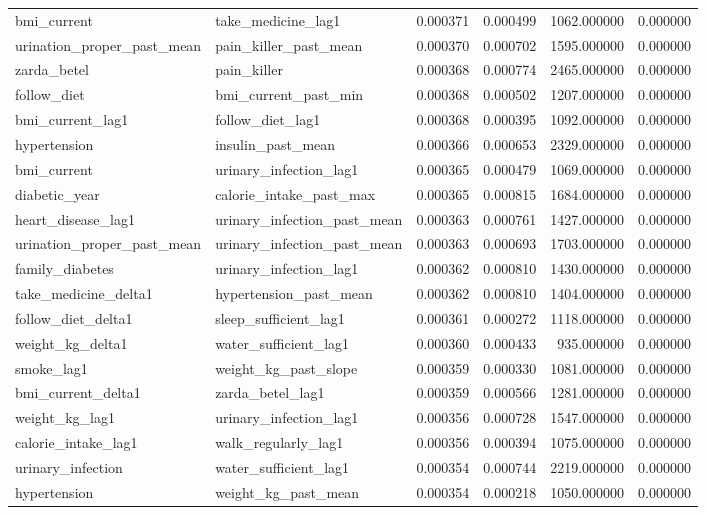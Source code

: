 \begin{longtable}{llrrrr}
bmi\_current & take\_medicine\_lag1 & 0.000371 & 0.000499 & 1062.000000 & 0.000000 \\
urination\_proper\_past\_mean & pain\_killer\_past\_mean & 0.000370 & 0.000702 & 1595.000000 & 0.000000 \\
zarda\_betel & pain\_killer & 0.000368 & 0.000774 & 2465.000000 & 0.000000 \\
follow\_diet & bmi\_current\_past\_min & 0.000368 & 0.000502 & 1207.000000 & 0.000000 \\
bmi\_current\_lag1 & follow\_diet\_lag1 & 0.000368 & 0.000395 & 1092.000000 & 0.000000 \\
hypertension & insulin\_past\_mean & 0.000366 & 0.000653 & 2329.000000 & 0.000000 \\
bmi\_current & urinary\_infection\_lag1 & 0.000365 & 0.000479 & 1069.000000 & 0.000000 \\
diabetic\_year & calorie\_intake\_past\_max & 0.000365 & 0.000815 & 1684.000000 & 0.000000 \\
heart\_disease\_lag1 & urinary\_infection\_past\_mean & 0.000363 & 0.000761 & 1427.000000 & 0.000000 \\
urination\_proper\_past\_mean & urinary\_infection\_past\_mean & 0.000363 & 0.000693 & 1703.000000 & 0.000000 \\
family\_diabetes & urinary\_infection\_lag1 & 0.000362 & 0.000810 & 1430.000000 & 0.000000 \\
take\_medicine\_delta1 & hypertension\_past\_mean & 0.000362 & 0.000810 & 1404.000000 & 0.000000 \\
follow\_diet\_delta1 & sleep\_sufficient\_lag1 & 0.000361 & 0.000272 & 1118.000000 & 0.000000 \\
weight\_kg\_delta1 & water\_sufficient\_lag1 & 0.000360 & 0.000433 & 935.000000 & 0.000000 \\
smoke\_lag1 & weight\_kg\_past\_slope & 0.000359 & 0.000330 & 1081.000000 & 0.000000 \\
bmi\_current\_delta1 & zarda\_betel\_lag1 & 0.000359 & 0.000566 & 1281.000000 & 0.000000 \\
weight\_kg\_lag1 & urinary\_infection\_lag1 & 0.000356 & 0.000728 & 1547.000000 & 0.000000 \\
calorie\_intake\_lag1 & walk\_regularly\_lag1 & 0.000356 & 0.000394 & 1075.000000 & 0.000000 \\
urinary\_infection & water\_sufficient\_lag1 & 0.000354 & 0.000744 & 2219.000000 & 0.000000 \\
hypertension & weight\_kg\_past\_mean & 0.000354 & 0.000218 & 1050.000000 & 0.000000 \\

\end{longtable}
